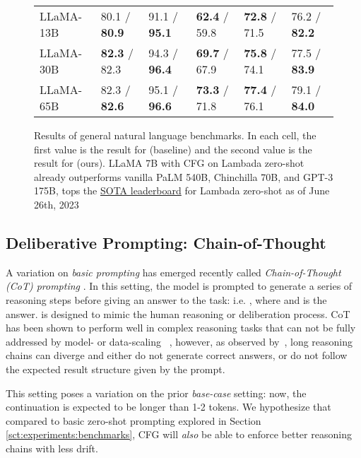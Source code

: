 \documentclass{article}
\begin{document}
\begin{figure}[t]
{\begin{tabular}{llllll}
        LLaMA-13B &   80.1 / \textbf{ 80.9} &   91.1 / \textbf{ 95.1} &  \textbf{ 62.4} /  59.8 &  \textbf{ 72.8} /  71.5 &   76.2 / \textbf{ 82.2}\\
        LLaMA-30B &  \textbf{ 82.3} /  82.3 &   94.3 / \textbf{ 96.4} &  \textbf{ 69.7} /  67.9 &  \textbf{ 75.8} /  74.1 &   77.5 / \textbf{ 83.9}\\
        LLaMA-65B &   82.3 / \textbf{ 82.6} &   95.1 / \textbf{ 96.6} &  \textbf{ 73.3} /  71.8 &  \textbf{ 77.4} /  76.1 &   79.1 / \textbf{ 84.0}\\
        \bottomrule
    \end{tabular}
    }
    \caption{Results of general natural language benchmarks. In each cell, the first value is the result for  (baseline) and the second value is the result for  (ours). LLaMA 7B with CFG on Lambada zero-shot already outperforms vanilla PaLM 540B, Chinchilla 70B, and GPT-3 175B, tops the \href{https://paperswithcode.com/sota/language-modelling-on-lambada}{SOTA leaderboard} for Lambada zero-shot as of June 26th, 2023}
    \label{tab:benchmark}
\end{figure}

\subsection{Deliberative Prompting: Chain-of-Thought}
\label{sct:experiments:cot}

A variation on \textit{basic prompting} has emerged recently called \textit{Chain-of-Thought (CoT) prompting} \cite{COT}. In this setting, the model is prompted to generate a series of reasoning steps before giving an answer to the task: i.e. , where  and  is the answer.  is designed to mimic the human reasoning or deliberation process. CoT has been shown to perform well in complex reasoning tasks that can not be fully addressed by model- or data-scaling ~\cite{rae}, however, as observed by~\cite{COT}, long reasoning chains can diverge and either do not generate correct answers, or do not follow the expected result structure given by the prompt.

This setting poses a variation on the prior \textit{base-case} setting: now, the continuation  is expected to be longer than 1-2 tokens. We hypothesize that compared to basic zero-shot prompting explored in Section \ref{sct:experiments:benchmarks}, CFG will \textit{also} be able to enforce better reasoning chains with less drift.
\end{document}
